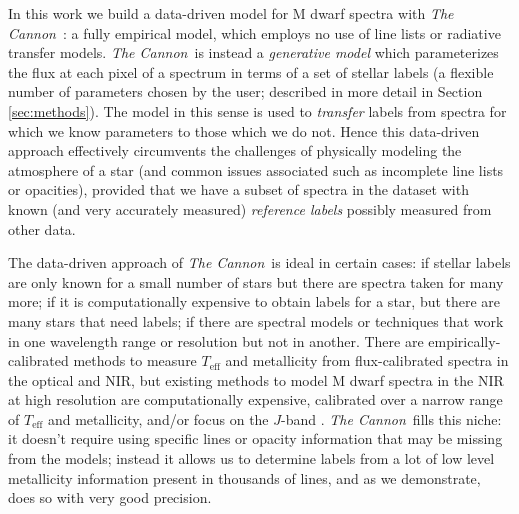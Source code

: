 \documentclass[twocolumn]{aastex62}
\newcommand{\thecannon}{\textsl{The Cannon}}
\newcommand{\teff}{T_{\mathrm{eff}}}
\begin{document}

In this work we build a data-driven model for M dwarf spectra with \thecannon\ \citep{Ness:2015,Casey:2016,Ho:2017a,Behmard2019}: a fully empirical model, which employs no use of line lists or radiative transfer models. 
\thecannon\ is instead a \emph{generative model} which parameterizes the flux at each pixel of a spectrum in terms of a set of stellar labels (a flexible number of parameters chosen by the user; described in more detail in Section \ref{sec:methods}). The model in this sense is used to \emph{transfer} labels from spectra for which we know parameters to those which we do not. Hence this data-driven approach effectively circumvents the challenges of physically modeling the atmosphere of a star (and common issues associated such as incomplete line lists or opacities), provided that we have a subset of spectra in the dataset with known (and very accurately measured) \emph{reference labels} possibly measured from other data. 


The data-driven approach of \thecannon\ is ideal in certain cases:
if stellar labels are only known for a small number of stars
but there are spectra taken for many more;
if it is computationally expensive to obtain labels for a star, but
there are many stars that need labels;
if there are spectral models or techniques that work in one wavelength range or resolution but not in another.
There are empirically-calibrated methods to measure $\teff$ and metallicity from flux-calibrated spectra in the optical and NIR, but existing methods to model M dwarf spectra in the NIR at high resolution are computationally expensive, calibrated over a narrow range of $\teff$ and metallicity, and/or focus on the $J$-band \citep{Lindgren:2016, Lindgren:2017}. \thecannon\ fills this niche: it doesn't require using specific lines or opacity information that may be missing from the models; instead it allows us to determine labels from a lot of low level metallicity information present in thousands of lines, and as we demonstrate, does so with very good precision.
\end{document}
